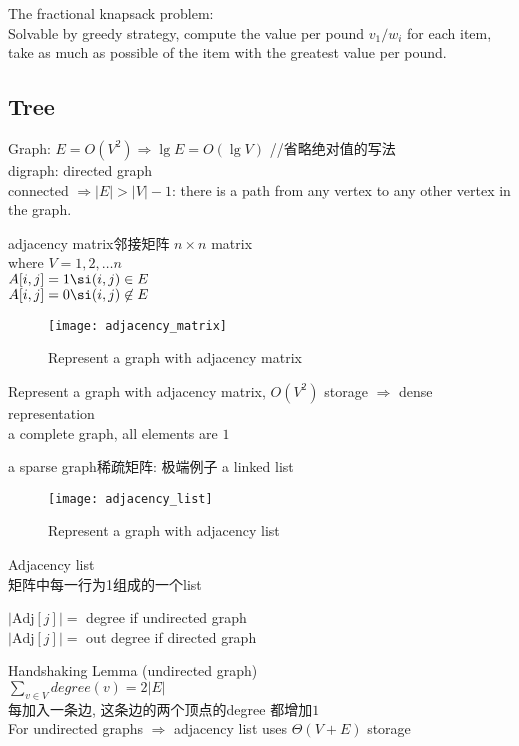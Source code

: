 \documentclass{article}
\begin{document}
The fractional knapsack problem:\\
Solvable by greedy strategy, compute the value per pound $v_1/w_i$ for each item, take as much as possible of the item with the greatest value per pound.

\subsection{Tree}
\noindent
Graph: $E = O(V^2) \Rightarrow \lg E = O(\lg V)$  //省略绝对值的写法\\
digraph: directed graph\\
connected $\Rightarrow |E| > |V| - 1$: there is a path from any vertex to any other vertex in the graph.

adjacency matrix邻接矩阵 $n \times n$ matrix\\
where $V={1,2, … n}$\\
$A[i,j] = 1 \si (i,j) \in E$\\
$A[i,j] = 0 \si (i,j) \not \in E$
\begin{figure}[htbp]
  \centering
  \texttt{[image: adjacency\_matrix]}\\
  \caption{Represent a graph with adjacency matrix}\label{fig.adjacency.matrix}
\end{figure}

Represent a graph with adjacency matrix, $O(V^2)$ storage $\Rightarrow$ dense representation\\
a complete graph, all elements are $1$

a sparse graph稀疏矩阵: 极端例子 a linked list
\begin{figure}[htbp]
  \centering
  \texttt{[image: adjacency\_list]}\\
  \caption{Represent a graph with adjacency list}\label{fig.adjacency.list}
\end{figure}

Adjacency list\\
矩阵中每一行为1组成的一个list

\noindent
$|\mbox{Adj}[j]| =$ degree  if undirected graph\\
$|\mbox{Adj}[j]| =$ out degree  if directed graph

Handshaking Lemma (undirected graph)\\
$\sum_{v \in V} degree(v) = 2|E|$\\
每加入一条边, 这条边的两个顶点的degree 都增加$1$\\
For undirected graphs $\Rightarrow$ adjacency list uses $\Theta(V+E)$ storage
\end{document}
